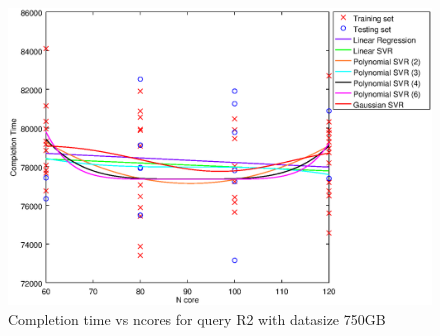 
\begin {figure}[hbtp]
\centering
\includegraphics[width=\textwidth]{output/R2_750_ONLY_1_LINEAR_NCORE/plot_R2_750.eps}
\caption{Completion time vs ncores for query R2 with datasize 750GB}
\label{fig:only_1_linear_R2_750}
\end {figure}
